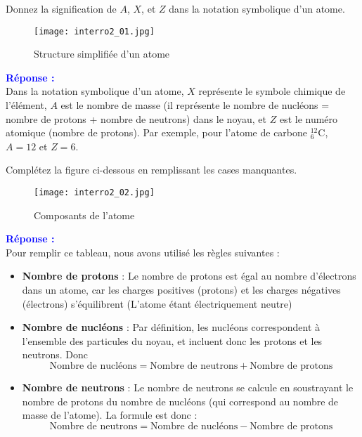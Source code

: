\documentclass{exam}
\begin{document}
\begin{questions}
  \question[1] Donnez la signification de $A$, $X$, et $Z$ dans la notation symbolique d'un atome.

  \begin{figure}[H]
    \centering
    \texttt{[image: interro2\_01.jpg]}
    \caption{Structure simplifiée d'un atome}
\end{figure} 

  \textbf{\textcolor{blue}{Réponse :}} \\
  Dans la notation symbolique d'un atome, $X$ représente le symbole chimique de l'élément, $A$ est le nombre de masse (il représente le nombre de nucléons = nombre de protons + nombre de neutrons) dans le noyau, et $Z$ est le numéro atomique (nombre de protons). Par exemple, pour l'atome de carbone ${}^{12}_{6}\text{C}$, $A = 12$ et $Z = 6$.

  \question[1.5] Complétez la figure ci-dessous en remplissant les cases manquantes.

  \begin{figure}[H]
    \centering
    \texttt{[image: interro2\_02.jpg]}
    \caption{Composants de l'atome}
\end{figure} 

  \textbf{\textcolor{blue}{Réponse :}} \\
  
  Pour remplir ce tableau, nous avons utilisé les règles suivantes :

\begin{itemize}
    \item \textbf{Nombre de protons} : Le nombre de protons est égal au nombre d'électrons dans un atome, car les charges positives (protons) et les charges négatives (électrons) s'équilibrent (L'atome étant électriquement neutre)
    \item \textbf{Nombre de nucléons} : Par définition, les nucléons correspondent à l'ensemble des particules du noyau, et incluent donc les protons et les neutrons. Donc 
    \[
    \text{Nombre de nucléons} = \text{Nombre de neutrons} + \text{Nombre de protons}
    \]
    \item \textbf{Nombre de neutrons} : Le nombre de neutrons se calcule en soustrayant le nombre de protons du nombre de nucléons (qui correspond au nombre de masse de l'atome). La formule est donc :
    \[
    \text{Nombre de neutrons} = \text{Nombre de nucléons} - \text{Nombre de protons}
    \]
\end{itemize}


\end{questions}
\end{document}
